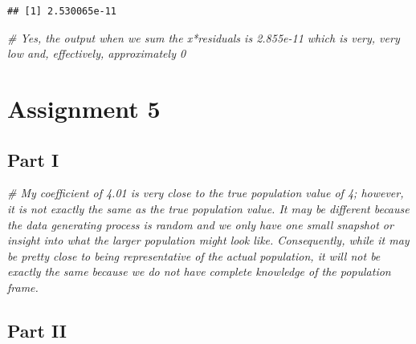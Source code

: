 \documentclass[]{article}
\newenvironment{Shaded}{\begin{snugshade}}{\end{snugshade}}
\newcommand{\CommentTok}[1]{\textcolor[rgb]{0.56,0.35,0.01}{\textit{#1}}}
\begin{document}
\begin{verbatim}
## [1] 2.530065e-11
\end{verbatim}

\begin{Shaded}
\begin{Highlighting}[]
\CommentTok{# Yes, the output when we sum the x*residuals is 2.855e-11 which is very, very low and, effectively, approximately 0}
\end{Highlighting}
\end{Shaded}

\section{Assignment 5}\label{assignment-5}

\subsection{Part I}\label{part-i-4}

\begin{Shaded}
\begin{Highlighting}[]
\CommentTok{# My coefficient of 4.01 is very close to the true population value of 4; however, it is not exactly the same as the true population value. It may be different because the data generating process is random and we only have one small snapshot or insight into what the larger population might look like. Consequently, while it may be pretty close to being representative of the actual population, it will not be exactly the same because we do not have complete knowledge of the population frame. }
\end{Highlighting}
\end{Shaded}

\subsection{Part II}\label{part-ii-3}
\end{document}
